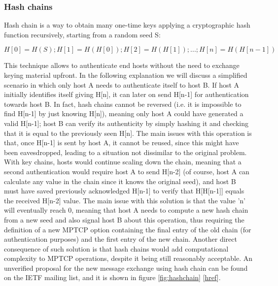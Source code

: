 \subsubsection{Hash chains}
Hash chain is a way to obtain many one-time keys applying a cryptographic hash function recursively, starting from a random seed S:
  
  \[H[0] = H(S); H[1] = H(H[0]); H[2] = H(H[1]); ...; H[n] = H(H[n-1])\]
  
This technique allows to authenticate end hosts without the need to exchange keying material upfront. In the following explanation we will discuss a simplified scenario in which only host A needs to authenticate itself to host B. If host A initially identifies itself giving H[n], it can later on send H[n-1] for authentication towards host B. In fact, hash chains cannot be reversed (i.e. it is impossible to find H[n-1] by just knowing H[n]), meaning only host A could have generated a valid H[n-1]; host B can verify its authenticity by simply hashing it and checking that it is equal to the previously seen H[n].
  The main issues with this operation is that, once H[n-1] is sent by host A, it cannot be reused, since this might have been eavesdropped, leading to a situation not dissimilar to the original problem. With key chains, hosts would continue scaling down the chain, meaning that a second authentication would require host A to send H[n-2] (of course, host A can calculate any value in the chain since it knows the original seed), and host B must have saved previously acknowledged H[n-1] to verify that H[H[n-1]] equals the received H[n-2] value.
  The main issue with this solution is that the value 'n' will eventually reach 0, meaning that host A needs to compute a new hash chain from a new seed and also signal host B about this operation, thus requiring the definition of a new MPTCP option containing the final entry of the old chain (for authentication purposes) and the first entry of the new chain.
  Another direct consequence of such solution is that hash chains would add computational complexity to MPTCP operations, despite it being still reasonably acceptable.
  An unverified proposal for the new message exchange using hash chain can be found on the IETF mailing list, and it is shown in figure \ref{fig:hashchain} [\href{https://www.ietf.org/mail-archive/web/multipathtcp/current/msg01275.html}{href}].
  
